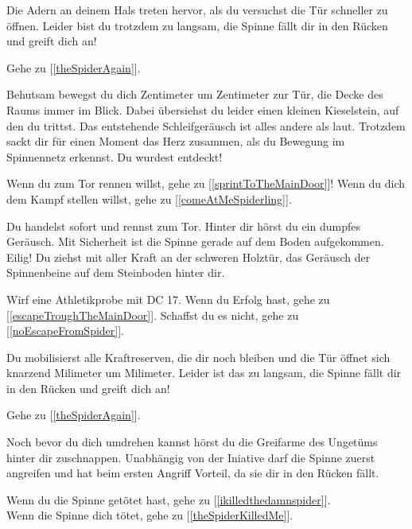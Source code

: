 Die Adern an deinem Hals treten hervor, als du versuchst die Tür schneller zu öffnen.
Leider bist du trotzdem zu langsam, die Spinne fällt dir in den Rücken und greift dich an!

Gehe zu [\ref{theSpiderAgain}].


Behutsam bewegst du dich Zentimeter um Zentimeter zur Tür, die Decke des Raums immer im Blick. Dabei übersiehst du leider einen kleinen Kieselstein, auf den du trittst. Das entstehende Schleifgeräusch ist alles andere als laut. Trotzdem sackt dir für einen Moment das Herz zusammen, als du Bewegung im Spinnennetz erkennst. Du wurdest entdeckt!

Wenn du zum Tor rennen willst, gehe zu [\ref{sprintToTheMainDoor}]!
Wenn du dich dem Kampf stellen willst, gehe zu [\ref{comeAtMeSpiderling}].


Du handelst sofort und rennst zum Tor. Hinter dir hörst du ein dumpfes Geräusch. Mit Sicherheit ist die Spinne gerade auf dem Boden aufgekommen. Eilig! Du ziehst mit aller Kraft an der schweren Holztür, das Geräusch der Spinnenbeine auf dem Steinboden hinter dir.

Wirf eine Athletikprobe mit DC 17. Wenn du Erfolg hast, gehe zu [\ref{escapeTroughTheMainDoor}]. Schaffst du es nicht, gehe zu [\ref{noEscapeFromSpider}].


Du mobilisierst alle Kraftreserven, die dir noch bleiben und die Tür öffnet sich knarzend Milimeter um Milimeter. Leider ist das zu langsam, die Spinne fällt dir in den Rücken und greift dich an!

Gehe zu [\ref{theSpiderAgain}].


Noch bevor du dich umdrehen kannst hörst du die Greifarme des Ungetüms hinter dir zuschnappen.
Unabhängig von der Iniative darf die Spinne zuerst angreifen und hat beim ersten Angriff Vorteil, da sie dir in den Rücken fällt.

Wenn du die Spinne getötet hast, gehe zu [\ref{ikilledthedamnspider}].
\\Wenn die Spinne dich tötet, gehe zu [\ref{theSpiderKilledMe}].


